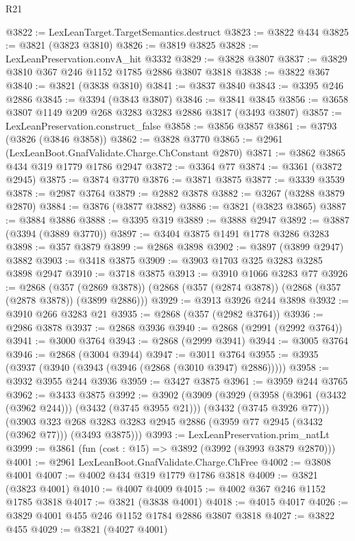 \begin{lexlean}{R21}
\begin{coremodule}
{{{{{{{{{{{{{{{{{{{@3822 := LexLeanTarget.TargetSemantics.destruct
@3823 := @3822 @434
@3825 := @3821 (@3823 @3810)
@3826 := @3819 @3825
@3828 := LexLeanPreservation.convA_hit @3332
@3829 := @3828 @3807
@3837 := @3829 @3810 @367 @246 @1152 @1785 @2886 @3807 @3818
@3838 := @3822 @367
@3840 := @3821 (@3838 @3810)
@3841 := @3837 @3840
@3843 := @3395 @246 @2886
@3845 := @3394 (@3843 @3807)
@3846 := @3841 @3845
@3856 := @3658 @3807 @1149 @209 @268 @3283 @3283 @2886 @3817 (@3493 @3807)
@3857 := LexLeanPreservation.construct_false
@3858 := @3856 @3857
@3861 := @3793 (@3826 (@3846 @3858))
@3862 := @3828 @3770
@3865 := @2961 (LexLeanBoot.GnafValidate.Charge.ChConstant @2870)
@3871 := @3862 @3865 @434 @319 @1779 @1786 @2947
@3872 := @3364 @77
@3874 := @3361 (@3872 @2945)
@3875 := @3874 @3770
@3876 := @3871 @3875
@3877 := @3339 @3539
@3878 := @2987 @3764
@3879 := @2882 @3878
@3882 := @3267 (@3288 @3879 @2870)
@3884 := @3876 (@3877 @3882)
@3886 := @3821 (@3823 @3865)
@3887 := @3884 @3886
@3888 := @3395 @319
@3889 := @3888 @2947
@3892 := @3887 (@3394 (@3889 @3770))
@3897 := @3404 @3875 @1491 @1778 @3286 @3283
@3898 := @357 @3879
@3899 := @2868 @3898
@3902 := @3897 (@3899 @2947) @3882
@3903 := @3418 @3875
@3909 := @3903 @1703 @325 @3283 @3285 @3898 @2947
@3910 := @3718 @3875
@3913 := @3910 @1066 @3283 @77
@3926 := @2868
    (@357 (@2869 @3878))
    (@2868 (@357 (@2874 @3878)) (@2868 (@357 (@2878 @3878)) (@3899 @2886)))
@3929 := @3913 @3926 @244 @3898
@3932 := @3910 @266 @3283 @21
@3935 := @2868 (@357 (@2982 @3764))
@3936 := @2986 @3878
@3937 := @2868 @3936
@3940 := @2868 (@2991 (@2992 @3764))
@3941 := @3000 @3764
@3943 := @2868 (@2999 @3941)
@3944 := @3005 @3764
@3946 := @2868 (@3004 @3944)
@3947 := @3011 @3764
@3955 := @3935 (@3937 (@3940 (@3943 (@3946 (@2868 (@3010 @3947) @2886)))))
@3958 := @3932 @3955 @244 @3936
@3959 := @3427 @3875
@3961 := @3959 @244 @3765
@3962 := @3433 @3875
@3992 := @3902
    (@3909
      (@3929
        (@3958 (@3961 (@3432 (@3962 @244))) (@3432 (@3745 @3955 @21)))
        (@3432 (@3745 @3926 @77)))
      (@3903 @323 @268 @3283 @3283 @2945 @2886 (@3959 @77 @2945 (@3432 (@3962 @77))) (@3493 @3875)))
@3993 := LexLeanPreservation.prim_natLt
@3999 := @3861 (fun (cost : @15) => @3892 (@3992 (@3993 @3879 @2870)))
@4001 := @2961 LexLeanBoot.GnafValidate.Charge.ChFree
@4002 := @3808 @4001
@4007 := @4002 @434 @319 @1779 @1786 @3818
@4009 := @3821 (@3823 @4001)
@4010 := @4007 @4009
@4015 := @4002 @367 @246 @1152 @1785 @3818
@4017 := @3821 (@3838 @4001)
@4018 := @4015 @4017
@4026 := @3829 @4001 @455 @246 @1152 @1784 @2886 @3807 @3818
@4027 := @3822 @455
@4029 := @3821 (@4027 @4001)
}}}}}}}}}}}}}}}}}}}
\end{coremodule}
\end{lexlean}
